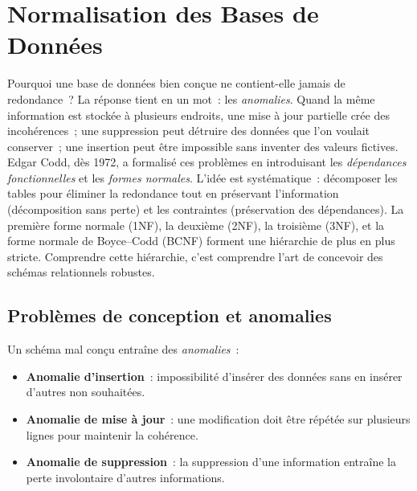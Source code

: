 \chapter{Normalisation des Bases de Donn\'ees}
\label{ch:normalisation}

Pourquoi une base de donn\'ees bien con\c{c}ue ne contient-elle jamais de redondance~? La r\'eponse tient en un mot~: les \emph{anomalies}. Quand la m\^eme information est stock\'ee \`a plusieurs endroits, une mise \`a jour partielle cr\'ee des incoh\'erences~; une suppression peut d\'etruire des donn\'ees que l'on voulait conserver~; une insertion peut \^etre impossible sans inventer des valeurs fictives. Edgar Codd, d\`es 1972, a formalis\'e ces probl\`emes en introduisant les \emph{d\'ependances fonctionnelles} et les \emph{formes normales}. L'id\'ee est syst\'ematique~: d\'ecomposer les tables pour \'eliminer la redondance tout en pr\'eservant l'information (d\'ecomposition sans perte) et les contraintes (pr\'eservation des d\'ependances). La premi\`ere forme normale (1NF), la deuxi\`eme (2NF), la troisi\`eme (3NF), et la forme normale de Boyce--Codd (BCNF) forment une hi\'erarchie de plus en plus stricte. Comprendre cette hi\'erarchie, c'est comprendre l'art de concevoir des sch\'emas relationnels robustes.

\section{Probl\`emes de conception et anomalies}

Un sch\'ema mal con\c{c}u entra\^ine des \emph{anomalies}~:

\begin{definition}
\begin{itemize}
    \item \textbf{Anomalie d'insertion}~: impossibilit\'e d'ins\'erer des donn\'ees
          sans en ins\'erer d'autres non souhait\'ees.
    \item \textbf{Anomalie de mise \`a jour}~: une modification doit \^etre
          r\'ep\'et\'ee sur plusieurs lignes pour maintenir la coh\'erence.
    \item \textbf{Anomalie de suppression}~: la suppression d'une information
          entra\^ine la perte involontaire d'autres informations.
\end{itemize}
\end{definition}

